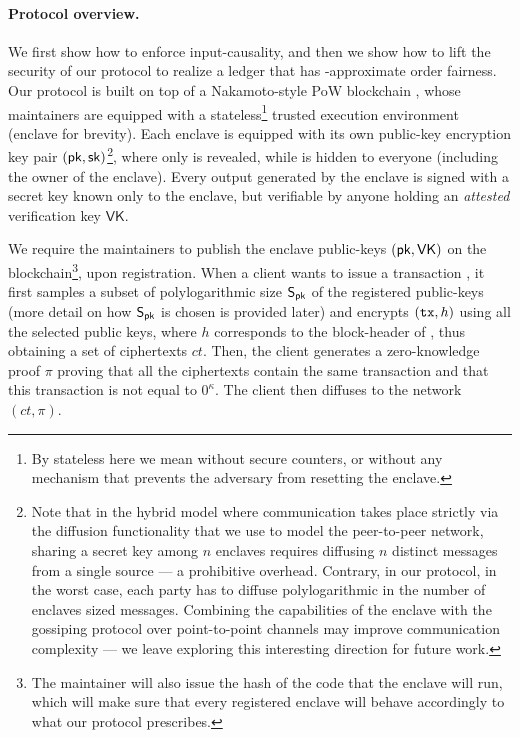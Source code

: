 \paragraph{Protocol overview.}
%
We first show how to enforce input-causality, and then we show how to lift the security of our protocol to realize a ledger that has \delay-approximate order fairness.
%
Our protocol is built on top of a Nakamoto-style PoW blockchain \chain, whose maintainers are equipped with a stateless\footnote{By stateless here we mean without secure counters, or without any mechanism that prevents the adversary from resetting the enclave.} trusted execution environment\cite{EPRINT:CosDev16} (enclave for brevity).
%
Each enclave is equipped with its own public-key encryption key pair $(\mathsf{pk}, \mathsf{sk})$\footnote{Note that in the hybrid model where communication takes place strictly via the diffusion functionality \funcDiffuse that we use to model the peer-to-peer network, sharing a secret key \sk among $n$ enclaves requires diffusing $n$ distinct messages from a single source --- a prohibitive overhead. Contrary, in our protocol, in the worst case, each party has to diffuse polylogarithmic in the number of enclaves sized messages. Combining the capabilities of the enclave with the gossiping protocol over point-to-point channels may improve communication complexity --- we leave exploring this interesting direction for future work.}, where only \pk is revealed, while \sk is hidden to everyone (including the owner of the enclave).
%
Every output generated by the enclave is signed with a secret key known only to the enclave, but verifiable by anyone holding an \emph{attested} verification key $\mathsf{VK}$.

We require the maintainers to publish the enclave public-keys $(\mathsf{pk}, \mathsf{VK})$ on the blockchain\footnote{The maintainer will also issue the hash of the code that the enclave will run, which will make sure that every registered enclave will behave accordingly to what our protocol prescribes.}, upon registration.
%
When a client wants to issue a transaction \tx, it first samples a subset of polylogarithmic size $\mathsf{S}_\mathsf{pk}$ of the registered public-keys (more detail on how $\mathsf{S}_\mathsf{pk}$ is chosen is provided later) and encrypts $(\mathtt{tx}, h)$ using all the selected public keys, where $h$ corresponds to the block-header of \chain, thus obtaining a set of ciphertexts $ct$.
%
Then, the client generates a zero-knowledge proof $\pi$ proving that all the ciphertexts contain the same transaction and that this transaction is not equal to $0^\kappa$.
%
The client then diffuses to the network $(ct, \pi)$.

